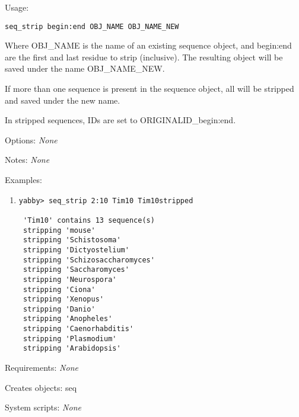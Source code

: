\begin{description}


\item{Usage:}

{\tt seq\_strip begin:end OBJ\_NAME OBJ\_NAME\_NEW}

Where OBJ\_NAME is the name of an existing sequence object, and
begin:end are the first and last residue to strip (inclusive).
The resulting object will be saved under the name OBJ\_NAME\_NEW.

If more than one sequence is present in the sequence object,
all will be stripped and saved under the new name.

In stripped sequences, IDs are set to ORIGINALID\_begin:end.


\item{Options:} {\em None}


\item{Notes:} {\em None}


\item{Examples:}
\begin{enumerate}

\item
\begin{verbatim}
yabby> seq_strip 2:10 Tim10 Tim10stripped

 'Tim10' contains 13 sequence(s)
 stripping 'mouse'
 stripping 'Schistosoma'
 stripping 'Dictyostelium'
 stripping 'Schizosaccharomyces'
 stripping 'Saccharomyces'
 stripping 'Neurospora'
 stripping 'Ciona'
 stripping 'Xenopus'
 stripping 'Danio'
 stripping 'Anopheles'
 stripping 'Caenorhabditis'
 stripping 'Plasmodium'
 stripping 'Arabidopsis'

\end{verbatim}

\end{enumerate}


\item{Requirements:} {\em None}


\item{Creates objects:} seq


\item{System scripts:} {\em None}

\end{description}


